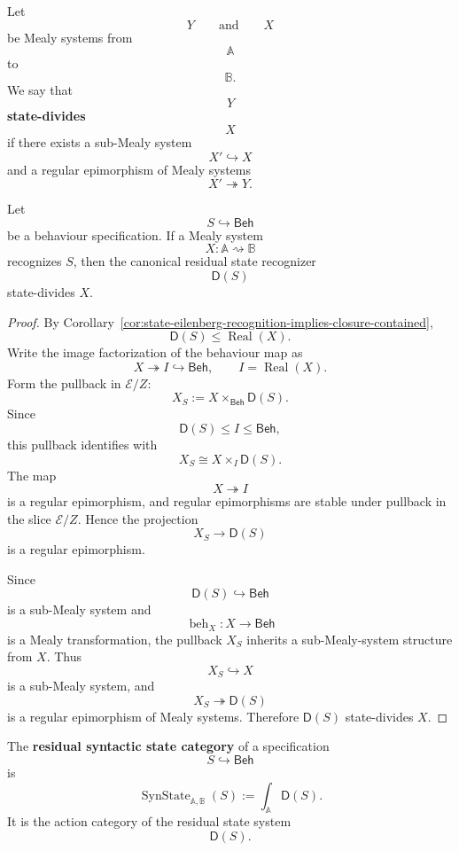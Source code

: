 \begin{definition}
\label{def:state-eilenberg-state-divisibility}
Let
\[
Y
\qquad\text{and}\qquad
X
\]
be Mealy systems from
\[
\mathbb A
\]
to
\[
\mathbb B.
\]
We say that
\[
Y
\]
\textbf{state-divides}
\[
X
\]
if there exists a sub-Mealy system
\[
X'\hookrightarrow X
\]
and a regular epimorphism of Mealy systems
\[
X'\twoheadrightarrow Y.
\]
\end{definition}

\begin{theorem}
\label{thm:state-eilenberg-state-syntactic-divisibility}
Let
\[
S\hookrightarrow\mathsf{Beh}
\]
be a behaviour specification. If a Mealy system
\[
X:\mathbb A\rightsquigarrow\mathbb B
\]
recognizes \(S\), then the canonical residual state recognizer
\[
\mathsf D(S)
\]
state-divides \(X\).
\end{theorem}

\begin{proof}
By Corollary~\ref{cor:state-eilenberg-recognition-implies-closure-contained},
\[
\mathsf D(S)\leq\operatorname{Real}(X).
\]
Write the image factorization of the behaviour map as
\[
X\twoheadrightarrow I\hookrightarrow \mathsf{Beh},
\qquad
I=\operatorname{Real}(X).
\]
Form the pullback in \(\mathcal E/Z\):
\[
X_S
:=
X\times_{\mathsf{Beh}}\mathsf D(S).
\]
Since
\[
\mathsf D(S)\leq I\leq\mathsf{Beh},
\]
this pullback identifies with
\[
X_S\cong X\times_I \mathsf D(S).
\]
The map
\[
X\twoheadrightarrow I
\]
is a regular epimorphism, and regular epimorphisms are stable under pullback
in the slice \(\mathcal E/Z\). Hence the projection
\[
X_S\to \mathsf D(S)
\]
is a regular epimorphism.

Since
\[
\mathsf D(S)\hookrightarrow\mathsf{Beh}
\]
is a sub-Mealy system and
\[
\operatorname{beh}_X:X\to\mathsf{Beh}
\]
is a Mealy transformation, the pullback \(X_S\) inherits a sub-Mealy-system
structure from \(X\). Thus
\[
X_S\hookrightarrow X
\]
is a sub-Mealy system, and
\[
X_S\twoheadrightarrow \mathsf D(S)
\]
is a regular epimorphism of Mealy systems. Therefore \(\mathsf D(S)\)
state-divides \(X\).
\end{proof}

\begin{definition}
\label{def:state-eilenberg-synstate}
The \textbf{residual syntactic state category} of a specification
\[
S\hookrightarrow\mathsf{Beh}
\]
is
\[
\operatorname{SynState}_{\mathbb A,\mathbb B}(S)
:=
\int_{\mathbb A}\mathsf D(S).
\]
It is the action category of the residual state system
\[
\mathsf D(S).
\]
\end{definition}

